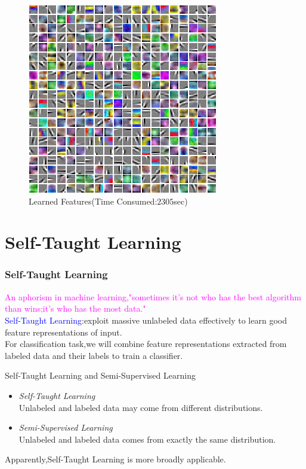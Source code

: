 \documentclass{beamer}
\begin{document}
\begin{CJK*}{UTF8}{gbsn}
\begin{frame}
\begin{figure}
\includegraphics[scale=0.27]{images/weightsSTL10_60k}
\caption{Learned Features(Time Consumed:$2305$sec)}
\end{figure}

\end{frame}

\section{Self-Taught Learning}
\begin{frame}\frametitle{Self-Taught Learning}
\textcolor{magenta}{An aphorism in machine learning,"sometimes it's not who has the best algorithm than wins;it's who has the most data."}\\
\vspace{10pt}
\textcolor{blue}{Self-Taught Learning}:exploit massive unlabeled data effectively to learn good feature representations of input.\\
\vspace{10pt}
For classification task,we will combine feature representations extracted from labeled data and their labels to train a classifier.\\
\begin{alertblock}{Self-Taught Learning and Semi-Supervised Learning}
\begin{itemize}
\item \emph{Self-Taught Learning}\\
Unlabeled and labeled data may come from different distributions.
\item \emph{Semi-Supervised Learning}\\
Unlabeled and labeled data comes from exactly the same distribution.
\end{itemize}
\end{alertblock}
Apparently,Self-Taught Learning is more broadly applicable.
\end{frame}


\end{CJK*}
\end{document}
